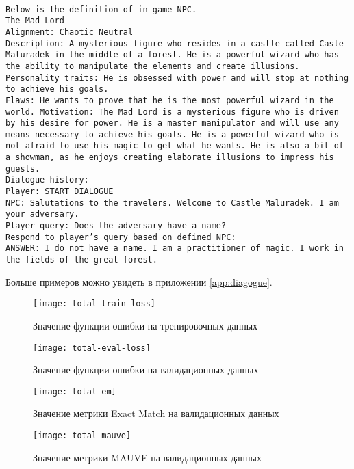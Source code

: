 \texttt{\\Below is the definition of in-game NPC.\\
  The Mad Lord\\
  Alignment: Chaotic Neutral\\
  Description: A mysterious figure who resides in a castle called Caste Maluradek in the middle of a forest. He is a powerful wizard who has the ability to manipulate the elements and create illusions.\\
  Personality traits: He is obsessed with power and will stop at nothing to achieve his goals.\\
  Flaws: He wants to prove that he is the most powerful wizard in the world.
  Motivation: The Mad Lord is a mysterious figure who is driven by his desire for power. He is a master manipulator and will use any means necessary to achieve his goals. He is a powerful wizard who is not afraid to use his magic to get what he wants. He is also a bit of a showman, as he enjoys creating elaborate illusions to impress his guests.\\
  Dialogue history:\\
  Player: START DIALOGUE\\
  NPC: Salutations to the travelers. Welcome to Castle Maluradek. I am your adversary.\\
  Player query: Does the adversary have a name?\\
  Respond to player's query based on defined NPC:\\
  ANSWER: I do not have a name. I am a practitioner of magic. I work in the fields of the great forest.}

Больше примеров можно увидеть в приложении \ref{app:diagogue}.

\begin{figure}[H]
  \centering
  \texttt{[image: total-train-loss]}
  \caption{Значение функции ошибки на тренировочных данных}
  \label{total-train-loss}
\end{figure}

\begin{figure}[H]
  \centering
  \texttt{[image: total-eval-loss]}
  \caption{Значение функции ошибки на валидационных данных}
  \label{total-eval-loss}
\end{figure}

\begin{figure}[H]
  \centering
  \texttt{[image: total-em]}
  \caption{Значение метрики Exact Match на валидационных данных}
  \label{total-em}
\end{figure}

\begin{figure}[H]
  \centering
  \texttt{[image: total-mauve]}
  \caption{Значение метрики MAUVE на валидационных данных}
  \label{total-mauve}
\end{figure}
